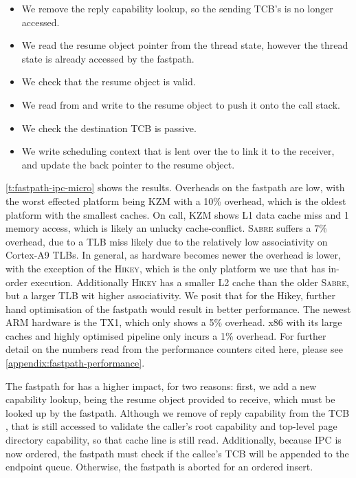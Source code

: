 \begin{itemize}
\item We remove the reply capability lookup, so the sending \gls{TCB}'s  is no
        longer accessed. 
\item We read the resume object pointer from the thread state, however the thread state is already accessed
    by the \call fastpath. 
\item We check that the resume object is valid. 
\item We read from and write to the resume object to push it onto the call stack.
\item We check the destination \gls{TCB} is passive.
\item We write scheduling context that is lent over the \call to link it to the receiver, and update
    the back pointer to the resume object.
\end{itemize}

\cref{t:fastpath-ipc-micro} shows the results.
Overheads on the \call fastpath are low, with the worst effected platform being
\textsc{KZM} with a 10\% overhead, which is the oldest platform with the smallest caches. On call,
\textsc{KZM} shows L1 data cache miss and 1 memory access, which is likely an unlucky cache-conflict. \textsc{Sabre} suffers a 7\% overhead, due to a \gls{TLB} miss likely
due to the relatively low associativity on Cortex-A9 \glspl{TLB}.  In general, as hardware becomes newer the
overhead is lower, with the exception of the \textsc{Hikey}, which is the only platform we use that has 
in-order execution. Additionally \textsc{Hikey} has a smaller L2 cache than the older \textsc{Sabre},
but a larger \gls{TLB} wit higher associativity.
We posit that for the Hikey, further hand optimisation of the fastpath would result in better
performance. The newest ARM hardware is the TX1, which only shows a 5\% overhead. x86 with its large
caches and highly optimised pipeline only incurs a 1\% overhead. For further detail on the
numbers read from the performance counters cited here, please see
\cref{appendix:fastpath-performance}.

The fastpath for \replyrecv has a higher impact, for two reasons: first, we add a new capability
lookup, being the resume object provided to receive, which must be looked up by the \replyrecv
fastpath. Although we remove of reply capability from the \gls{TCB}
, that  is still accessed to validate the caller's root \cnode capability
and top-level page directory capability, so that cache line is still read. Additionally, because
\gls{IPC} is now ordered, the fastpath must check if the callee's \gls{TCB} will be appended to the
endpoint queue. Otherwise, the fastpath is aborted for an ordered insert. 


